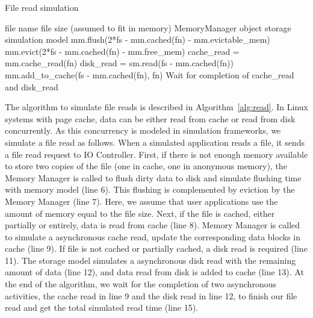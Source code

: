 \documentclass[conference]{IEEEtran}
\newcommand{\Desc}[2]{\State \makebox[2em][l]{#1}#2}
\newcommand{\valerie}[1]{\color{blue}\textbf{From Valerie:}#1\color{black}}
\begin{document}
			\begin{algorithm}\caption{File read simulation}\label{alg:read}
				\small
				\begin{algorithmic}[1]
					\Input
        				\Desc{fn}{file name}
        				\Desc{fs}{file size (assumed to fit in memory)}
						\Desc{mm}{MemoryManager object}
						\Desc{sm}{storage simulation model}
   					\EndInput
					\State mm.flush(2*fs - mm.cached(fn) - mm.evictable\_mem) 
					\State mm.evict(2*fs - mm.cached(fn) - mm.free\_mem) 
					  
    					\State cache\_read = mm.cache\_read(fn)  
					\EndIf
					 
						\State disk\_read = sm.read(fs - mm.cached(fn)) 
						\State mm.add\_to\_cache(fs - mm.cached(fn), fn)
					\EndIf					
					\State Wait for completion of cache\_read and disk\_read 
				\end{algorithmic}
			\end{algorithm}			
			
			The algorithm to simulate file reads is described in Algorithm~\ref{alg:read}.   
			In Linux systems with page cache, data can be either read from cache 
			or read from disk concurrently. As this concurrency is modeled in simulation 
			frameworks, we simulate a file read as follows.
			When a simulated application reads a file, it sends a file read request 
			to IO Controller. 
			First, if there is not enough memory available to store two
			copies of the file (one in cache, one in anonymous memory), the
			Memory Manager is called to flush dirty data to disk and simulate 
			flushing time with memory model (line 6).
			This flushing is complemented by eviction by the Memory Manager (line 7). 
			Here, we assume that user applications use the amount of memory 
			equal to the file size. 
			Next, if the file is cached, either partially or entirely, data is read from cache (line 8). 
			Memory Manager is called to simulate a asynchronous cache read, 
			update the corresponding data blocks in cache (line 9). 
			If file is not cached or partially cached, a disk read is required (line 11). 
			The storage model simulates a asynchronous disk read with the remaining 
            amount of data (line 12), and data read from disk is added to 
            cache (line 13). 
            At the end of the algorithm, we wait for the completion of two 
            asynchronous activities, the cache read in line 9 and the disk read in line 12, 
            to finish our file read and get the total simulated read time (line 15). 
\end{document}
